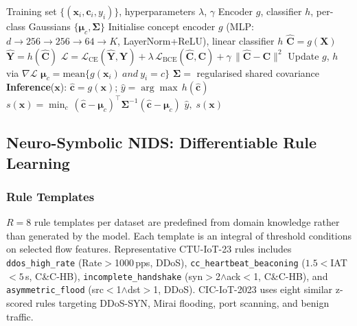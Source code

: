 \documentclass[journal]{IEEEtran}
\begin{document}
\begin{algorithm}[!ht]
\caption{CBM Training and OOD Scoring}
\label{alg:cbm}
\begin{algorithmic}[1]
\footnotesize
\Require Training set $\{(\mathbf{x}_i, \mathbf{c}_i, y_i)\}$,
         hyperparameters $\lambda$, $\gamma$
\Ensure  Encoder $g$, classifier $h$,
         per-class Gaussians $\{\boldsymbol{\mu}_c, \boldsymbol{\Sigma}\}$
\State Initialise concept encoder $g$ (MLP: $d{\to}256{\to}256{\to}64{\to}K$, LayerNorm+ReLU), linear classifier $h$
    \State $\hat{\mathbf{C}} = g(\mathbf{X})$
    \State $\hat{\mathbf{Y}} = h(\hat{\mathbf{C}})$
    \State $\mathcal{L} = \mathcal{L}_{\mathrm{CE}}(\hat{\mathbf{Y}},\mathbf{Y})
             + \lambda\,\mathcal{L}_{\mathrm{BCE}}(\hat{\mathbf{C}},\mathbf{C})
             + \gamma\,\|\hat{\mathbf{C}}-\mathbf{C}\|^2$
    \State Update $g$, $h$ via $\nabla\mathcal{L}$
  \EndFor
\EndFor
{} 
  \State $\boldsymbol{\mu}_c = \mathrm{mean}\{g(\mathbf{x}_i)~and ~y_i = c\}$
\EndFor
\State $\boldsymbol{\Sigma} =$ regularised shared covariance
\Statex
\Statex \textbf{Inference}($\mathbf{x}$):
\State $\hat{\mathbf{c}} = g(\mathbf{x})$;\quad
       $\hat{y} = \arg\max\, h(\hat{\mathbf{c}})$
\State $s(\mathbf{x}) = \min_c\,
       (\hat{\mathbf{c}}-\boldsymbol{\mu}_c)^\top
       \boldsymbol{\Sigma}^{-1}
       (\hat{\mathbf{c}}-\boldsymbol{\mu}_c)$
\State \Return $\hat{y},\; s(\mathbf{x})$
\end{algorithmic}
\end{algorithm}

\subsection{Neuro-Symbolic NIDS: Differentiable Rule Learning}
\label{sec:nesy}

\subsubsection{Rule Templates}
$R{=}8$ rule templates per dataset are predefined from domain knowledge rather than generated by the model. Each template is an  integral of threshold conditions on selected flow features. Representative CTU-IoT-23
rules includes \texttt{ddos\_high\_rate} (Rate$>$1000\,pps, DDoS), \texttt{cc\_heartbeat\_beaconing} ($1.5{<}$IAT$<5$\,s, C\&C-HB), \texttt{incomplete\_handshake} (syn$>$2$\wedge$ack$<$1, C\&C-HB), and \texttt{asymmetric\_flood} (src$<$1$\wedge$dst$>$1, DDoS). CIC-IoT-2023 uses eight similar z-scored rules targeting DDoS-SYN, Mirai flooding, port scanning, and benign traffic.
\end{document}
